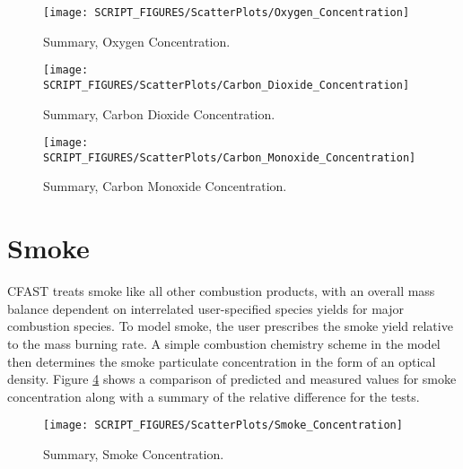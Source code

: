 \begin{figure}
\texttt{[image: SCRIPT\_FIGURES/ScatterPlots/Oxygen\_Concentration]}
\caption[Summary, Oxygen Concentration]
{Summary, Oxygen Concentration.}
\label{fig:Species_Scatter}
\end{figure}

\begin{figure}
\texttt{[image: SCRIPT\_FIGURES/ScatterPlots/Carbon\_Dioxide\_Concentration]}
\caption[Summary, Carbon Dioxide Concentration]
{Summary, Carbon Dioxide Concentration.}
\label{fig:Species_Scatter}
\end{figure}

\begin{figure}
\texttt{[image: SCRIPT\_FIGURES/ScatterPlots/Carbon\_Monoxide\_Concentration]}
\caption[Summary, Carbon Monoxide Concentration]
{Summary, Carbon Monoxide Concentration.}
\label{fig:Species_Scatter}
\end{figure}


\section{Smoke}

CFAST treats smoke like all other combustion products, with an overall mass balance dependent on interrelated user-specified species yields for major combustion species.  To model smoke, the user prescribes the smoke yield relative to the mass burning rate.  A simple combustion chemistry scheme in the model then determines the smoke particulate concentration in the form of an optical density.  Figure \ref{fig:Smoke_Scatter} shows a comparison of predicted and measured values for smoke concentration along with a summary of the relative difference for the tests.
\label{Smoke Concentration}

\begin{figure}
\begin{center}
\texttt{[image: SCRIPT\_FIGURES/ScatterPlots/Smoke\_Concentration]}
\end{center}
\caption[Summary, Smoke Concentration]{Summary, Smoke Concentration.} \label{fig:Smoke_Scatter}
\end{figure}
